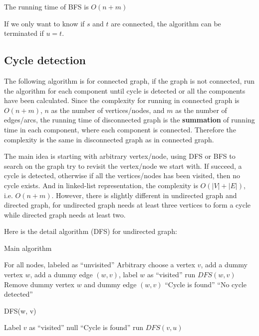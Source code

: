					The running time of BFS is $O(n + m)$

					If we only want to know if $s$ and $t$ are connected, the algorithm can be terminated if $u = t$.

				\subsection{Cycle detection}
					The following algorithm is for connected graph, if the graph is not connected, run the algorithm for each component until cycle is detected or all the components have been calculated. Since the complexity for running in connected graph is $O(n + m)$, $n$ as the number of vertices/nodes, and $m$ as the number of edges/arcs, the running time of disconnected graph is the \textbf{summation} of running time in each component, where each component is connected. Therefore the complexity is the same in disconnected graph as in connected graph.

					The main idea is starting with arbitrary vertex/node, using DFS or BFS to search on the graph try to revisit the vertex/node we start with. If succeed, a cycle is detected, otherwise if all the vertices/nodes has been visited, then no cycle exists. And in linked-list representation, the complexity is $O(|V| + |E|)$, i.e. $O(n + m)$. However, there is slightly different in undirected graph and directed graph, for undirected graph needs at least three vertices to form a cycle while directed graph needs at least two.

					Here is the detail algorithm (DFS) for undirected graph:
					\begin{algorithm}[H]
						\caption{Main algorithm}
						\begin{algorithmic}[1]
							\State For all nodes, labeled as ``unvisited''
							\State Arbitrary choose a vertex $v$, add a dummy vertex $w$, add a dummy edge $(w, v)$, label $w$ as ``visited''
							\State run $DFS(w, v)$
							\State Remove dummy vertex $w$ and dummy edge $(w, v)$
								\State \Return ``Cycle is found''
							\Else
								\State \Return ``No cycle detected''
							\EndIf
						\end{algorithmic}
					\end{algorithm}

					\begin{algorithm}[H]
						\caption{DFS(w, v)}
						\begin{algorithmic}[1]
							\State Label $v$ as ``visited''
								\State \Return null
							\Else
										\State \Return ``Cycle is found'' 
									\Else
										\State run $DFS(v, u)$
									\EndIf
								\EndFor
							\EndIf
						\end{algorithmic}
					\end{algorithm}

